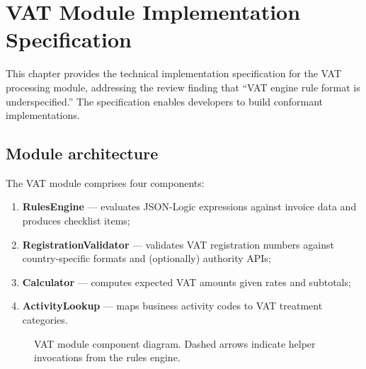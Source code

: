 \chapter{VAT Module Implementation Specification}\label{ch:vat-impl}

This chapter provides the technical implementation specification for the VAT
processing module, addressing the review finding that ``VAT engine rule format
is underspecified.'' The specification enables developers to build conformant
implementations.

\section{Module architecture}

The VAT module comprises four components:

\begin{enumerate}
  \item \textbf{RulesEngine} --- evaluates JSON-Logic expressions against invoice
        data and produces checklist items;
  \item \textbf{RegistrationValidator} --- validates VAT registration numbers
        against country-specific formats and (optionally) authority APIs;
  \item \textbf{Calculator} --- computes expected VAT amounts given rates and
        subtotals;
  \item \textbf{ActivityLookup} --- maps business activity codes to VAT
        treatment categories.
\end{enumerate}

\begin{figure}[htbp]
\centering
{}
\caption{VAT module component diagram. Dashed arrows indicate helper
         invocations from the rules engine.}
\label{fig:vat-arch}
\end{figure}

